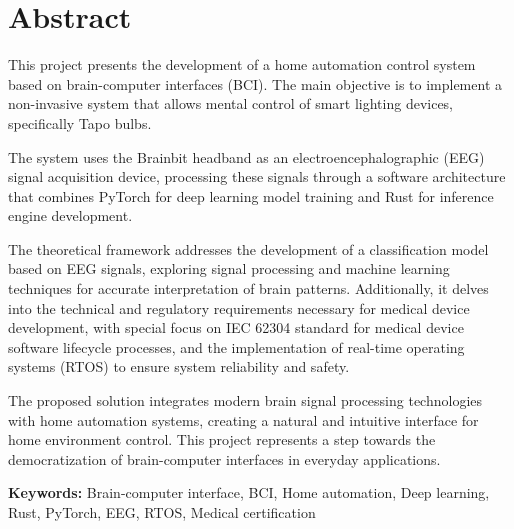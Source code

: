 \chapter*{Abstract}

This project presents the development of a home automation control system based on brain-computer interfaces (BCI). The main objective is to implement a non-invasive system that allows mental control of smart lighting devices, specifically Tapo bulbs.

The system uses the Brainbit headband as an electroencephalographic (EEG) signal acquisition device, processing these signals through a software architecture that combines PyTorch for deep learning model training and Rust for inference engine development.

The theoretical framework addresses the development of a classification model based on EEG signals, exploring signal processing and machine learning techniques for accurate interpretation of brain patterns. Additionally, it delves into the technical and regulatory requirements necessary for medical device development, with special focus on IEC 62304 standard for medical device software lifecycle processes, and the implementation of real-time operating systems (RTOS) to ensure system reliability and safety.

The proposed solution integrates modern brain signal processing technologies with home automation systems, creating a natural and intuitive interface for home environment control. This project represents a step towards the democratization of brain-computer interfaces in everyday applications.

\vspace{0.5cm}
\noindent\textbf{Keywords:} Brain-computer interface, BCI, Home automation, Deep learning, Rust, PyTorch, EEG, RTOS, Medical certification